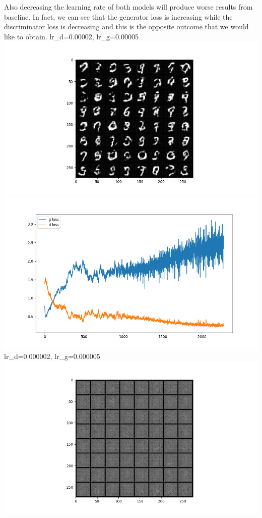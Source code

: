 Also decreasing the learning rate of both models will produce worse
results from baseline. In fact, we can see that the generator loss is
increasing while the discriminator loss is decreasing and this is the
opposite outcome that we would like to obtain. lr\_d=0.00002,
lr\_g=0.00005
\includegraphics{./images/Pasted image 20231229113931.png}\includegraphics{./images/Pasted image 20231229114009.png}
lr\_d=0.000002, lr\_g=0.000005
\includegraphics{./images/Pasted image 20231229114045.png}
